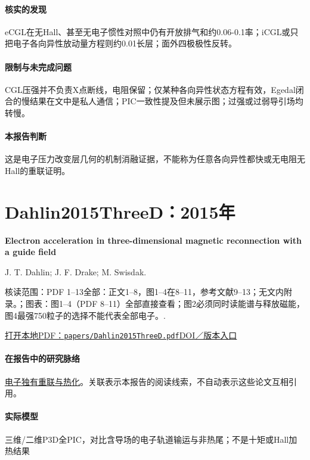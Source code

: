 \paragraph{核实的发现}eCGL在无Hall、甚至无电子惯性对照中仍有开放排气和约0.06-0.1率；iCGL或只把电子各向异性放动量方程则约0.01长层；面外四极极性反转。

\paragraph{限制与未完成问题}CGL压强并不负责X点断线，电阻保留；仅某种各向异性状态方程有效，Egedal闭合的慢结果在文中是私人通信；PIC一致性提及但未展示图；过强或过弱导引场均转慢。

\paragraph{本报告判断}这是电子压力改变层几何的机制消融证据，不能称为任意各向异性都快或无电阻无Hall的重联证明。

\section{Dahlin2015ThreeD：2015年}\label{paper:Dahlin2015ThreeD}

\textbf{Electron acceleration in three-dimensional magnetic reconnection with a guide field}\citep{Dahlin2015ThreeD}\

J. T. Dahlin;  J. F. Drake;  M. Swisdak.

\textsf{核读范围：}PDF 1–13全部：正文1–8，图1–4在8–11，参考文献9–13；无文内附录。；\textsf{图表：}图1–4（PDF 8–11）全部直接查看；图2必须同时读能谱与释放磁能，图4最强750粒子的选择不能代表全部电子。.

\href{run:papers/Dahlin2015ThreeD.pdf}{打开本地PDF：\texttt{papers/Dahlin2015ThreeD.pdf}}\quad\href{https://doi.org/10.1063/1.4933212}{DOI／版本入口}

\paragraph{在报告中的研究脉络}\hyperref[story:energy]{电子独有重联与热化}。关联表示本报告的阅读线索，不自动表示这些论文互相引用。

\paragraph{实际模型}三维/二维P3D全PIC，对比含导场的电子轨道输运与非热尾；不是十矩或Hall加热结果

